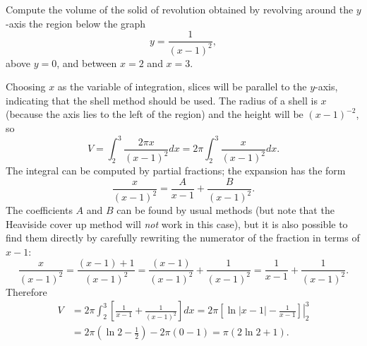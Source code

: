 \documentclass{ximera}
\begin{document}
\begin{question}%
Compute the volume of the solid of revolution obtained by revolving around the $y$-axis the region below the graph
\[ y = \frac{1}{(x-1)^2}, \]
above $y=0$, and between $x=2$ and $x=3$.
\begin{multipleChoice}
\choice{\bigmath{\pi}}
\end{multipleChoice}

\begin{feedback}
Choosing $x$ as the variable of integration, slices will be parallel to the $y$-axis, indicating that the shell method should be used. The radius of a shell is $x$ (because the axis lies to the left of the region) and the height will be $(x-1)^{-2}$, so 
\[ V = \int_2^3 \frac{2 \pi x}{(x-1)^2} dx = 2 \pi \int_2^3 \frac{x}{(x-1)^2} dx. \]
The integral can be computed by partial fractions; the expansion has the form
\[ \frac{x}{(x-1)^2} = \frac{A}{x-1} + \frac{B}{(x-1)^2}. \]
The coefficients $A$ and $B$ can be found by usual methods (but note that the Heaviside cover up method will \textit{not} work in this case), but it is also possible to find them directly by carefully rewriting the numerator of the fraction in terms of $x-1$:
\[ \frac{x}{(x-1)^2} = \frac{(x-1) + 1}{(x-1)^2} = \frac{(x-1)}{(x-1)^2} + \frac{1}{(x-1)^2} = \frac{1}{x-1} + \frac{1}{(x-1)^2}. \]
Therefore
\[ \begin{aligned} V & = 2 \pi \int_2^3 \left[ \frac{1}{x-1} + \frac{1}{(x-1)^2} \right] dx = 2 \pi \left. \left[ \ln |x-1| - \frac{1}{x-1} \right] \right|_{2}^3 \\
& = 2 \pi \left( \ln 2 - \frac{1}{2} \right) - 2 \pi \left( 0 - 1 \right) = \pi(2 \ln 2 + 1). \end{aligned}\]
\end{feedback}
\end{question}
\end{document}
